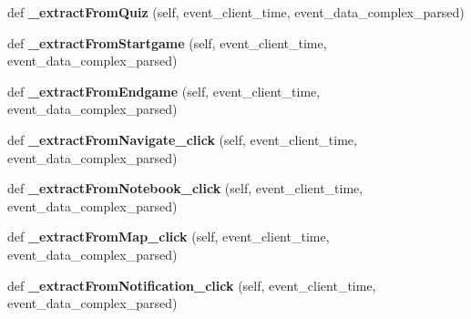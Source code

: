 \begin{DoxyCompactItemize}
def {\bfseries \+\_\+extract\+From\+Quiz} (self, event\+\_\+client\+\_\+time, event\+\_\+data\+\_\+complex\+\_\+parsed)
\item 
\mbox{\label{classfeature__extractors_1_1_jowilder_extractor_1_1_jowilder_extractor_acf443a819ccae8efbb6e1bbfdd692420}} 
def {\bfseries \+\_\+extract\+From\+Startgame} (self, event\+\_\+client\+\_\+time, event\+\_\+data\+\_\+complex\+\_\+parsed)
\item 
\mbox{\label{classfeature__extractors_1_1_jowilder_extractor_1_1_jowilder_extractor_a43e2a7bf5dd6d15da1afea86b9c4096d}} 
def {\bfseries \+\_\+extract\+From\+Endgame} (self, event\+\_\+client\+\_\+time, event\+\_\+data\+\_\+complex\+\_\+parsed)
\item 
\mbox{\label{classfeature__extractors_1_1_jowilder_extractor_1_1_jowilder_extractor_ae7a32ae5884f5a61f4deb7783457b364}} 
def {\bfseries \+\_\+extract\+From\+Navigate\+\_\+click} (self, event\+\_\+client\+\_\+time, event\+\_\+data\+\_\+complex\+\_\+parsed)
\item 
\mbox{\label{classfeature__extractors_1_1_jowilder_extractor_1_1_jowilder_extractor_a4944a54b53ce34022ca39976ad2e5f9d}} 
def {\bfseries \+\_\+extract\+From\+Notebook\+\_\+click} (self, event\+\_\+client\+\_\+time, event\+\_\+data\+\_\+complex\+\_\+parsed)
\item 
\mbox{\label{classfeature__extractors_1_1_jowilder_extractor_1_1_jowilder_extractor_acd08041f121f28a5f5bc2f6dc3281364}} 
def {\bfseries \+\_\+extract\+From\+Map\+\_\+click} (self, event\+\_\+client\+\_\+time, event\+\_\+data\+\_\+complex\+\_\+parsed)
\item 
\mbox{\label{classfeature__extractors_1_1_jowilder_extractor_1_1_jowilder_extractor_ae7cbd1fd6244ff97a569865750316f31}} 
def {\bfseries \+\_\+extract\+From\+Notification\+\_\+click} (self, event\+\_\+client\+\_\+time, event\+\_\+data\+\_\+complex\+\_\+parsed)

\end{DoxyCompactItemize}
